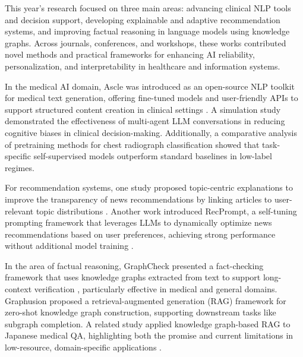 This year’s research focused on three main areas: advancing clinical NLP tools and decision support, developing explainable and adaptive recommendation systems, and improving factual reasoning in language models using knowledge graphs. Across journals, conferences, and workshops, these works contributed novel methods and practical frameworks for enhancing AI reliability, personalization, and interpretability in healthcare and information systems.

In the medical AI domain, Ascle was introduced as an open-source NLP toolkit for medical text generation, offering fine-tuned models and user-friendly APIs to support structured content creation in clinical settings \cite{ireneli-1}. A simulation study demonstrated the effectiveness of multi-agent LLM conversations in reducing cognitive biases in clinical decision-making. Additionally, a comparative analysis of pretraining methods for chest radiograph classification showed that task-specific self-supervised models outperform standard baselines in low-label regimes\cite{ireneli-2,ireneli-3}.

For recommendation systems, one study proposed topic-centric explanations to improve the transparency of news recommendations by linking articles to user-relevant topic distributions \cite{ireneli-4}. Another work introduced RecPrompt, a self-tuning prompting framework that leverages LLMs to dynamically optimize news recommendations based on user preferences, achieving strong performance without additional model training \cite{ireneli-5}.

In the area of factual reasoning, GraphCheck presented a fact-checking framework that uses knowledge graphs extracted from text to support long-context verification \cite{ireneli-6}, particularly effective in medical and general domains. Graphusion proposed a retrieval-augmented generation (RAG) framework for zero-shot knowledge graph construction, supporting downstream tasks like subgraph completion. A related study applied knowledge graph-based RAG to Japanese medical QA, highlighting both the promise and current limitations in low-resource, domain-specific applications \cite{ireneli-7,ireneli-8}.
